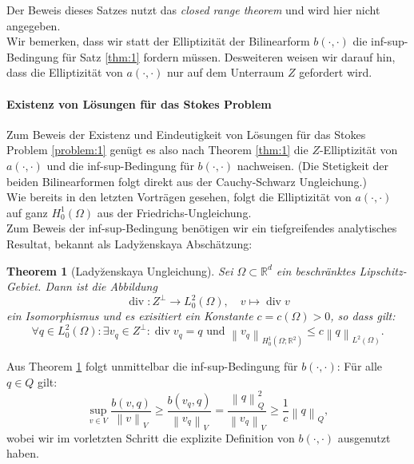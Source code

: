 \documentclass[a4paper]{scrartcl}
\newcommand{\real}{\mathbb{R}}
\newcommand{\Hzero}{H_0^1}
\newcommand{\Ltwo}{L^2}
\newcommand{\vnorm}[1]{\left\lVert#1\right\rVert_V}
\newcommand{\norm}[1]{\left\lVert#1\right\rVert}
\DeclareMathOperator{\divOp}{div}
\theoremstyle{plain}
\newtheorem{theorem}{Theorem}
\theoremstyle{definition}
\theoremstyle{remark}
\begin{document}
\noindent Der Beweis dieses Satzes nutzt das \emph{closed range theorem} und
wird hier nicht angegeben. \\
Wir bemerken, dass wir statt der Elliptizität der Bilinearform \(b(\cdot,
\cdot)\) die inf-sup-Bedingung für Satz \ref{thm:1} fordern
müssen. Desweiteren weisen wir darauf hin, dass die Elliptizität von
\(a(\cdot, \cdot)\) nur auf dem Unterraum \(Z\) gefordert wird. \\


\paragraph{Existenz von Lösungen für das Stokes Problem}
\label{sec:exist-von-losung}

Zum Beweis der Existenz und Eindeutigkeit von Lösungen für das Stokes
Problem \ref{problem:1} genügt es also nach Theorem \ref{thm:1} die
\(Z\)-Elliptizität von \(a(\cdot, \cdot)\) und die 
inf-sup-Bedingung für \(b(\cdot, \cdot)\) nachweisen. (Die Stetigkeit
der beiden Bilinearformen folgt direkt aus der Cauchy-Schwarz
Ungleichung.)\\

\noindent Wie bereits in den letzten Vorträgen gesehen, folgt die
Elliptizität von \(a(\cdot, \cdot)\) auf ganz \(\Hzero(\Omega)\) aus der Friedrichs-Ungleichung. \\ 
Zum Beweis der inf-sup-Bedingung benötigen wir ein tiefgreifendes
analytisches Resultat, bekannt als Lady\u{z}enskaya Abschätzung: 

\begin{theorem}[Lady\u{z}enskaya Ungleichung] \label{thm:2}
  Sei \(\Omega \subset \real^d\) ein beschränktes
  Lipschitz-Gebiet. Dann ist die Abbildung 
  \[\divOp \colon Z^\perp \rightarrow \Ltwo_0(\Omega), \quad v \mapsto
  \divOp v\]
  ein Isomorphismus und es exisitiert ein Konstante \(c = c(\Omega) >
  0\), so dass gilt: 
  \[\forall q \in \Ltwo_0(\Omega)\colon \exists v_q \in Z^\perp \colon 
  \divOp v_q = q \text{ und } \norm{v_q}_{\Hzero(\Omega; \real^2)} \leq c \norm{q}_{\Ltwo(\Omega)}.\]
\end{theorem}

\noindent Aus Theorem \ref{thm:2} folgt unmittelbar die
inf-sup-Bedingung für \(b(\cdot, \cdot)\): Für alle \(q\in Q\) gilt: 
\begin{equation}
  \label{eq:8}
  \sup_{v\in V} \frac{b(v,q)}{\vnorm{v}} \geq \frac{b(v_q,q)}{\vnorm{v_q}} = \frac{\norm{q}^2_Q}{\vnorm{v_q}} \geq \frac{1}{c} \norm{q}_Q,  
\end{equation}
wobei wir im vorletzten Schritt die explizite Definition von
\(b(\cdot, \cdot)\)  ausgenutzt haben. \\
\end{document}
